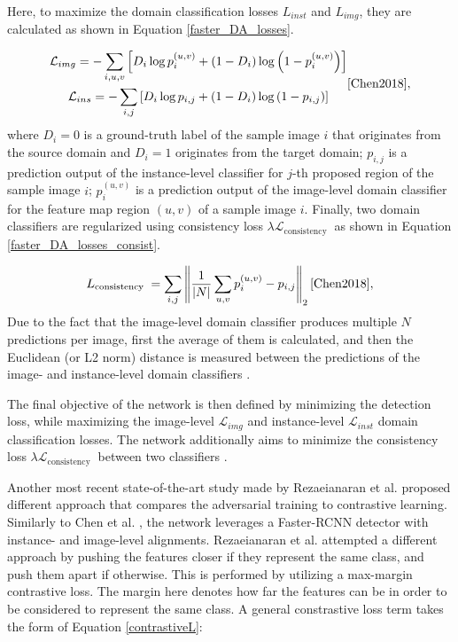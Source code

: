 \documentclass[english, 12pt, a4paper, elec, utf8, a-1b, online]{aaltothesis}
\begin{document}
Here, to maximize the domain classification losses $L_{inst}$ and $L_{img}$, they are calculated as shown in Equation \ref{faster_DA_losses}. 

\begin{equation}
\label{faster_DA_losses} 
\begin{gathered}
\mathcal{L}_{i m g}=-\sum_{i, u, v}\left[D_{i} \log p_{i}^{(u, v)}+\left(1-D_{i}\right) \log \left(1-p_{i}^{(u, v)}\right)\right] \\ 
\mathcal{L}_{i n s} = -\sum_{i, j}\left[D_{i} \log p_{i, j}+\left(1-D_{i}\right) \log \left(1-p_{i, j}\right)\right]
\end{gathered}
\cite{Chen2018}, 
\end{equation}
where $D_i=0$ is a ground-truth label of the sample image $i$ that originates from  the source domain and $D_i=1$ originates from the target domain; $p_{i,j}$ is a prediction output of the instance-level classifier for $j$-th proposed region of the sample image $i$; $p_{i}^{(u, v)}$ is a prediction output of the image-level domain classifier for the feature map region $(u,v)$ of a sample image $i$. 
Finally, two domain classifiers are regularized using consistency loss $\lambda \mathcal{L}_{\text {consistency }}$ as shown in Equation \ref{faster_DA_losses_consist}.  

\begin{equation}
\label{faster_DA_losses_consist} 
L_{\text {consistency }}=\sum_{i, j}\left\|\frac{1}{|N|} \sum_{u, v} p_{i}^{(u, v)}-p_{i, j}\right\|_{2}
\cite{Chen2018}, 
\end{equation}
Due to the fact that the image-level domain classifier produces multiple $N$ predictions per image, first the average of them is calculated, and then the Euclidean (or L2 norm) distance is measured between the predictions of the image- and instance-level domain classifiers \cite{Chen2018}. 

The final objective of the network is then defined by minimizing the detection loss, while maximizing the image-level $\mathcal{L}_{img}$ and instance-level $\mathcal{L}_{inst}$ domain classification losses. The network additionally aims to minimize the consistency loss $\lambda \mathcal{L}_{\text {consistency }}$ between two classifiers \cite{Chen2018}.

Another most recent state-of-the-art study made by Rezaeianaran et al. \cite{Rezaeianaran2021} proposed different approach that compares the adversarial training to contrastive learning. Similarly to Chen et al. \cite{Chen2018}, the network leverages a Faster-RCNN detector with instance- and image-level alignments. Rezaeianaran et al. attempted a different approach by pushing the features closer if they represent the same class, and push them apart if otherwise. This is performed by utilizing a max-margin contrastive loss. The margin here denotes how far the features can be in order to be considered to represent the same class. A general constrastive loss term takes the form of Equation \ref{contrastiveL}:
\end{document}
